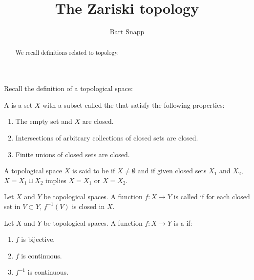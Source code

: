 \documentclass{ximera}
\author{Bart Snapp}
\title{The Zariski topology}
\begin{document}
\begin{abstract}
  We recall definitions related to topology. 
\end{abstract}
\maketitle

Recall the definition of a topological space:

\begin{definition}
  A  is a set $X$ with a subset called the
   that satisfy the following properties:
  \begin{enumerate}
  \item The empty set and $X$ are closed.
  \item Intersections of arbitrary collections of closed sets are
    closed.
  \item Finite unions of closed sets are closed.
  \end{enumerate}
\end{definition}


\begin{definition}
  A topological space $X$ is said to be  if $X\ne
  \emptyset$ and if given closed sets $X_1$ and $X_2$, $X=X_1\cup X_2$
  implies $X=X_1$ or $X=X_2$.
\end{definition}




\begin{definition}
  Let $X$ and $Y$ be topological spaces. A function $f:X\to Y$ is
  called  if for each closed set in $V \subset Y$,
  $f^{-1}(V)$ is closed in $X$.
\end{definition}



\begin{definition}
  Let $X$ and $Y$ be topological spaces. A function $f:X\to Y$ is a
   if:
  \begin{enumerate}
  \item $f$ is bijective.
  \item $f$ is continuous.
  \item $f^{-1}$ is continuous.
  \end{enumerate}
\end{definition}
\end{document}
